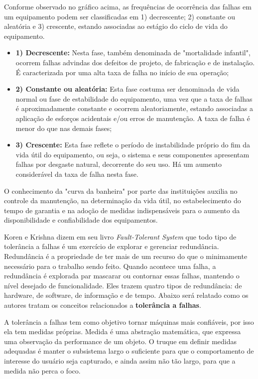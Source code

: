 Conforme observado no gráfico acima, as frequências de ocorrência das falhas em um equipamento podem ser classificadas em 1) decrescente; 2) constante ou aleatória e 3) crescente, estando associadas ao estágio do ciclo de vida do equipamento.

\begin{itemize}
	\item \textbf{1) Decrescente:} Nesta fase, também denominada de "mortalidade infantil", ocorrem falhas advindas dos defeitos de projeto, de fabricação e de instalação. É caracterizada por uma alta taxa de falha no início de sua operação;
	\item \textbf{2) Constante ou aleatória:} Esta fase costuma ser denominada de vida normal ou fase de estabilidade do equipamento, uma vez que a taxa de falhas é aproximadamente constante e ocorrem aleatoriamente, estando associadas a aplicação de esforços acidentais e/ou erros de manutenção. A taxa de falha é menor do que nas demais fases;
	\item \textbf{3) Crescente:} Esta fase reflete o período de instabilidade próprio do fim da vida útil do equipamento, ou seja, o sistema e seus componentes apresentam falhas por desgaste natural, decorrente do seu uso. Há um aumento considerável da taxa de falha nesta fase.  
\end{itemize} 

O conhecimento da "curva da banheira" por parte das instituições auxilia no controle da manutenção, na determinação da vida útil, no estabelecimento do tempo de garantia e na adoção de medidas indispensáveis para o aumento da disponibilidade e confiabilidade dos equipamentos.

Koren e Krishna \cite{koren2007} dizem em seu livro \emph{Fault-Tolerant System} que todo tipo de tolerância a falhas é um exercício de explorar e gerenciar redundância. Redundância é a propriedade de ter mais de um recurso do que o minimamente necessário para o trabalho sendo feito. Quando acontece uma falha, a redundância é explorada par mascarar ou contornar essas falhas, mantendo o nível desejado de funcionalidade. Eles trazem quatro tipos de redundância: de hardware, de software, de informação e de tempo. Abaixo será relatado como os autores tratam os conceitos relacionados a \textbf{tolerância a falhas}. 

A tolerância a falhas tem como objetivo tornar máquinas mais confiáveis, por isso ela tem medidas próprias. Medida é uma abstração matemática, que expressa uma observação da performance de um objeto. O truque em definir medidas adequadas é manter o subsistema largo o suficiente para que o comportamento de interesse do usuário seja capturado, e ainda assim não tão largo, para que a medida não perca o foco. 

